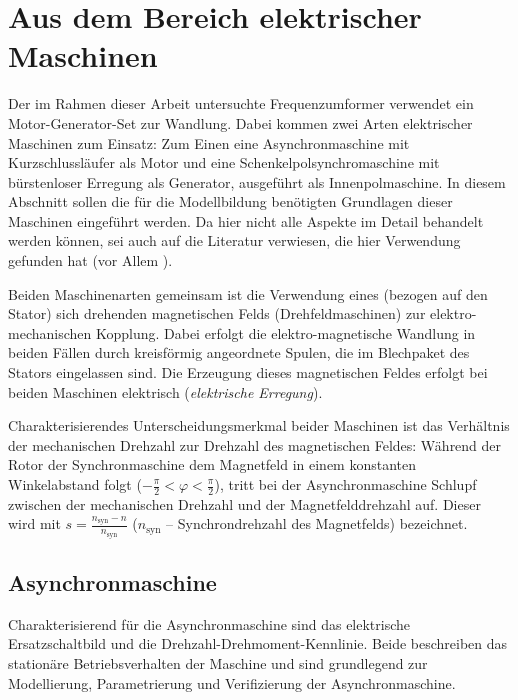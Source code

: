 \section{Aus dem Bereich elektrischer Maschinen}
\label{sec:GrundlagenEMaschinen}
Der im Rahmen dieser Arbeit untersuchte Frequenzumformer verwendet ein Motor-Generator-Set zur Wandlung. Dabei kommen zwei Arten elektrischer Maschinen zum Einsatz: Zum Einen eine Asynchronmaschine mit Kurzschlussläufer als Motor und eine Schenkelpolsynchromaschine mit bürstenloser Erregung als Generator, ausgeführt als Innenpolmaschine. In diesem Abschnitt sollen die für die Modellbildung benötigten Grundlagen dieser Maschinen eingeführt werden. Da hier nicht alle Aspekte im Detail behandelt werden können, sei auch auf die Literatur verwiesen, die hier Verwendung gefunden hat (vor Allem \cites{binderElektrischeMaschinenUnd2012,beckElektrischeEnergietechnikEinfuhrung2008,mullerGrundlagenElektrischerMaschinen2005}).

Beiden Maschinenarten gemeinsam ist die Verwendung eines (bezogen auf den Stator) sich drehenden magnetischen Felds (Drehfeldmaschinen) zur elektro-mechanischen Kopplung. Dabei erfolgt die elektro-magnetische Wandlung in beiden Fällen durch kreisförmig angeordnete Spulen, die im Blechpaket des Stators eingelassen sind. Die Erzeugung dieses magnetischen Feldes erfolgt bei beiden Maschinen elektrisch (\emph{elektrische Erregung}).

Charakterisierendes Unterscheidungsmerkmal beider Maschinen ist das Verhältnis der mechanischen Drehzahl zur Drehzahl des magnetischen Feldes: Während der Rotor der Synchronmaschine dem Magnetfeld in einem konstanten Winkelabstand folgt (\(-\frac{\pi}{2} < \varphi < \frac{\pi}{2}\)), tritt bei der Asynchronmaschine Schlupf zwischen der mechanischen Drehzahl und der Magnetfelddrehzahl auf. Dieser wird mit \(s=\frac{n_{\mathrm{syn}} - n}{n_{\mathrm{syn}}}\) (\(n_{\mathrm{syn}}\) -- Synchrondrehzahl des Magnetfelds) bezeichnet.

\subsection{Asynchronmaschine}
Charakterisierend für die Asynchronmaschine sind das elektrische Ersatzschaltbild und die Drehzahl-Drehmoment-Kennlinie. Beide beschreiben das stationäre Betriebsverhalten der Maschine und sind grundlegend zur Modellierung, Parametrierung und Verifizierung der Asynchronmaschine.
